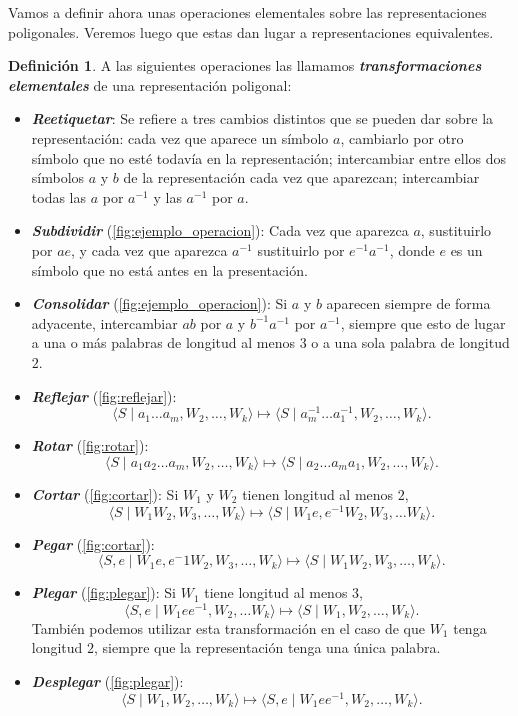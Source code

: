 \documentclass[10pt]{report}
\newcommand{\enfatiza}[1]{\textbf{\textit{#1}}}
\theoremstyle{definition}
\newtheorem{defin}{Definición}[section]
\begin{document}
Vamos a definir ahora unas operaciones elementales sobre las representaciones poligonales. Veremos luego que estas dan lugar a representaciones equivalentes.

\begin{defin}%
A las siguientes operaciones las llamamos \enfatiza{transformaciones elementales} de una representación poligonal:
\begin{itemize}
\item \enfatiza{Reetiquetar}: Se refiere a tres cambios distintos que se pueden dar sobre la representación: cada vez que aparece un símbolo $a$, cambiarlo por otro símbolo que no esté todavía en la representación; intercambiar entre ellos dos símbolos $a$ y $b$ de la representación cada vez que aparezcan; intercambiar todas las $a$ por $a^{-1}$ y las $a^{-1}$ por $a$.
\item \enfatiza{Subdividir} (\autoref{fig:ejemplo_operacion}): Cada vez que aparezca $a$, sustituirlo por $ae$, y cada vez que aparezca $a^{-1}$ sustituirlo por $e^{-1}a^{-1}$, donde $e$ es un símbolo que no está antes en la presentación.
\item \enfatiza{Consolidar} (\autoref{fig:ejemplo_operacion}): Si $a$ y $b$ aparecen siempre de forma adyacente, intercambiar $ab$ por $a$ y $b^{-1}a^{-1}$ por $a^{-1}$, siempre que esto de lugar a una o más palabras de longitud al menos $3$ o a una sola palabra de longitud $2$.
\item \enfatiza{Reflejar} (\autoref{fig:reflejar}): $$\langle S\mid   a_1 \dots a_m, W_2,\dots,W_k\rangle \mapsto \langle S\mid   a_m^{-1}\dots a_1^{-1}, W_2, \dots ,W_k\rangle .$$
\item \enfatiza{Rotar} (\autoref{fig:rotar}): $$\langle S\mid a_1a_2\dots a_m, W_2,\dots , W_k\rangle \mapsto \langle S\mid   a_2\dots a_ma_1, W_2,\dots , W_k\rangle .$$
\item \enfatiza{Cortar} (\autoref{fig:cortar}): Si $W_1$ y $W_2$ tienen longitud al menos $2$, $$\langle S\mid W_1W_2, W_3,\dots , W_k\rangle \mapsto \langle S\mid W_1e, e^{-1}W_2, W_3,\dots W_k\rangle .$$ 
\item \enfatiza{Pegar} (\autoref{fig:cortar}): $$\langle S,e\mid W_1e, e^-1W_2, W_3,\dots , W_k\rangle \mapsto \langle S\mid W_1W_2, W_3,\dots , W_k\rangle .$$
\item \enfatiza{Plegar} (\autoref{fig:plegar}): Si $W_1$ tiene longitud al menos $3$, $$\langle S,e\mid W_1ee^{-1}, W_2,\dots W_k\rangle \mapsto \langle S\mid W_1, W_2,\dots , W_k\rangle .$$ También podemos utilizar esta transformación en el caso de que $W_1$ tenga longitud $2$, siempre que la representación tenga una única palabra.
\item \enfatiza{Desplegar} (\autoref{fig:plegar}): $$\langle S\mid W_1, W_2,\dots , W_k\rangle \mapsto \langle S,e\mid W_1ee^{-1}, W_2,\dots , W_k\rangle .$$
\end{itemize}
\end{defin}
\end{document}
